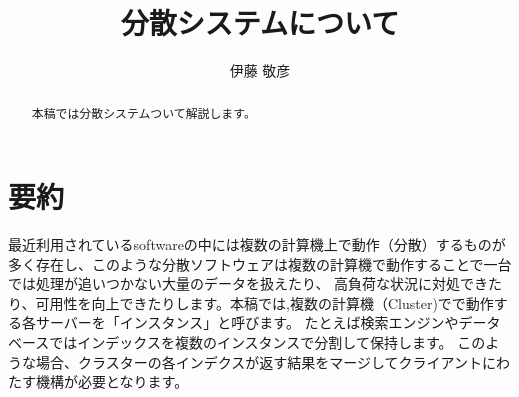 \documentclass[a4paper, 10pt]{jarticle}
\title{分散システムについて}
\author{伊藤 敬彦}
\begin{document}
\maketitle
\begin{abstract}
本稿では分散システムついて解説します。
\end{abstract}

\section{要約}
最近利用されているsoftwareの中には複数の計算機上で動作（分散）するものが多く存在し、このような分散ソフトウェアは複数の計算機で動作することで一台では処理が追いつかない大量のデータを扱えたり、
高負荷な状況に対処できたり、可用性を向上できたりします。本稿では,複数の計算機（Cluster)でで動作する各サーバーを「インスタンス」と呼びます。
たとえば検索エンジンやデータベースではインデックスを複数のインスタンスで分割して保持します。
このような場合、クラスターの各インデクスが返す結果をマージしてクライアントにわたす機構が必要となります。

\end{document}
